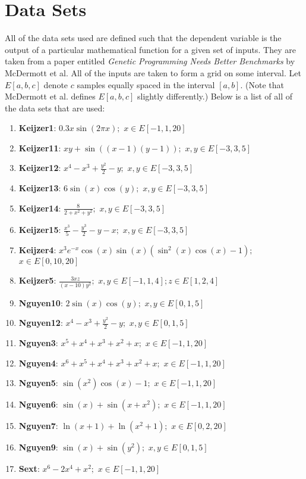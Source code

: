 \chapter{Data Sets}
\label{appendix:data_sets}

All of the data sets used are defined such that the dependent variable is the output of a particular mathematical function for a given set of inputs.  They are taken from a paper entitled \textit{Genetic Programming Needs Better Benchmarks} by McDermott et al. \cite{benchmarks}  All of the inputs are taken to form a grid on some interval.  Let $E[a, b, c]$ denote $c$ samples equally spaced in the interval $[a,b]$. (Note that McDermott et al. defines $E[a, b, c]$ slightly differently.)  Below is a list of all of the data sets that are used:

\begin{enumerate}[noitemsep]
\item \textbf{Keijzer1}: $0.3x \sin(2 \pi x);$ $x \in E[-1,1,20]$
\item \textbf{Keijzer11}: $x y+\sin((x-1)(y-1));$ $x, y \in E[-3,3,5]$
\item \textbf{Keijzer12}: $x^{4}-x^{3}+\frac{y^{2}}{2}-y;$ $x, y \in E[-3,3,5]$
\item \textbf{Keijzer13}: $6 \sin(x) \cos(y);$ $x, y \in E[-3,3,5]$
\item \textbf{Keijzer14}: $\frac{8}{2 + x^{2} + y^{2}};$ $x,y \in E[-3,3,5]$
\item \textbf{Keijzer15}: $\frac{x^{3}}{5} - \frac{y^{3}}{2} - y - x;$ $x, y \in E[-3,3,5]$
\item \textbf{Keijzer4}: $x^{3} e^{-x} \cos(x) \sin(x) (\sin^{2}(x) \cos(x) - 1);$ $x \in E[0,10,20]$
\item \textbf{Keijzer5}: $\frac{3 x z}{(x - 10) y^{2}};$ $x,y \in E[-1,1,4]; z \in E[1,2,4]$
\item \textbf{Nguyen10}: $2 \sin(x) \cos(y);$ $x,y \in E[0,1,5]$
\item \textbf{Nguyen12}: $x^{4} - x^{3} + \frac{y^{2}}{2} - y;$ $x,y \in E[0,1,5]$
\item \textbf{Nguyen3}: $x^{5} + x^{4} + x^{3} + x^{2} + x;$ $x \in E[-1,1,20]$
\item \textbf{Nguyen4}: $x^{6} + x^{5} + x^{4} + x^{3} + x^{2} + x;$ $x \in E[-1,1,20]$
\item \textbf{Nguyen5}: $\sin(x^{2}) \cos(x) - 1;$ $x \in E[-1,1,20]$
\item \textbf{Nguyen6}: $\sin(x) + \sin(x + x^{2});$ $x \in E[-1,1,20]$
\item \textbf{Nguyen7}: $\ln(x + 1) + \ln(x^{2} + 1);$ $x \in E[0,2,20]$
\item \textbf{Nguyen9}: $\sin(x) + \sin(y^{2});$ $x,y \in E[0,1,5]$
\item \textbf{Sext}: $x^{6} - 2 x^{4} + x^{2};$ $x \in E[-1,1,20]$
\end{enumerate}